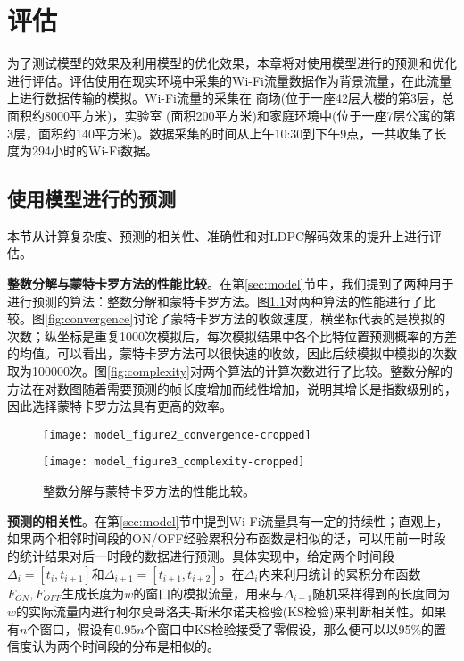 
\chapter{评估}
\label{chap:evaluation}

为了测试模型的效果及利用模型的优化效果，本章将对使用模型进行的预测和优化进行评估。评估使用在现实环境中采集的Wi-Fi流量数据作为背景流量，在此流量上进行数据传输的模拟。Wi-Fi流量的采集在
商场(位于一座42层大楼的第3层，总面积约8000平方米)，实验室
(面积200平方米)和家庭环境中(位于一座7层公寓的第3层，面积约140平方米)。数据采集的时间从上午10:30到下午9点，一共收集了长度为294小时的Wi-Fi数据。
\section{使用模型进行的预测}
本节从计算复杂度、预测的相关性、准确性和对LDPC解码效果的提升上进行评估。

\textbf{整数分解与蒙特卡罗方法的性能比较}。在第\ref{sec:model}节中，我们提到了两种用于进行预测的算法：整数分解和蒙特卡罗方法。图\ref{fig:predict_comparison}对两种算法的性能进行了比较。图\ref{fig:convergence}讨论了蒙特卡罗方法的收敛速度，横坐标代表的是模拟的次数；纵坐标是重复1000次模拟后，每次模拟结果中各个比特位置预测概率的方差的均值。可以看出，蒙特卡罗方法可以很快速的收敛，因此后续模拟中模拟的次数取为100000次。图\ref{fig:complexity}对两个算法的计算次数进行了比较。整数分解的方法在对数图随着需要预测的帧长度增加而线性增加，说明其增长是指数级别的，因此选择蒙特卡罗方法具有更高的效率。
\begin{figure}[b]
	\begin{minipage}[b]{.5\linewidth}
		\texttt{[image: model\_figure2\_convergence-cropped]}
		\label{fig:convergence}
	\end{minipage}
	\hfill
	\begin{minipage}[b]{.5\linewidth}
		\texttt{[image: model\_figure3\_complexity-cropped]}
		\label{fig:complexity}
	\end{minipage}
	\caption{整数分解与蒙特卡罗方法的性能比较。}\label{fig:predict_comparison}
\end{figure}

\textbf{预测的相关性}。在第\ref{sec:model}节中提到Wi-Fi流量具有一定的持续性；直观上，如果两个相邻时间段的ON/OFF经验累积分布函数是相似的话，可以用前一时段的统计结果对后一时段的数据进行预测。具体实现中，给定两个时间段$\Delta_i = [t_i, t_{i+1}]$和$\Delta_{i+1} = [t_{i+1}, t_{i+2}]$。在$\Delta_i$内来利用统计的累积分布函数$F_{ON},F_{OFF}$生成长度为$w$的窗口的模拟流量，用来与$\Delta_{i+1}$随机采样得到的长度同为$w$的实际流量内进行柯尔莫哥洛夫-斯米尔诺夫检验(KS检验)来判断相关性。如果有$n$个窗口，假设有$0.95n$个窗口中KS检验接受了零假设，那么便可以以95\%的置信度认为两个时间段的分布是相似的。

